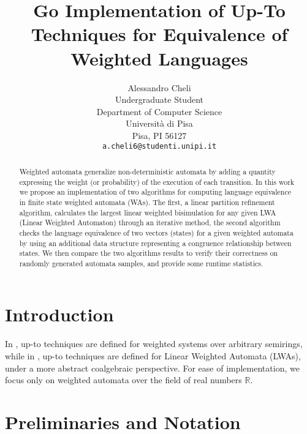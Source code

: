 \documentclass{article}
\title{Go Implementation of Up-To Techniques for Equivalence of Weighted Languages}
\author{
  Alessandro Cheli \\
  Undergraduate Student \\
  Department of Computer Science \\
  Università di Pisa\\
  Pisa, PI 56127 \\
  \texttt{a.cheli6@studenti.unipi.it} \\
}
\theoremstyle{plain}%
\theoremstyle{definition}
\theoremstyle{remark}
\def\R{\mathbb{R}}
\begin{document}
\maketitle

\begin{abstract}
Weighted automata generalize non-deterministic automata by adding
a quantity expressing the weight (or probability) of the execution of each transition.
In this work we propose an implementation of two algorithms for computing language 
equivalence in finite state weighted automata (WAs). The first, a
linear partition refinement algorithm, calculates the largest linear weighted bisimulation
for any given LWA (Linear Weighted Automaton) through an iterative method, 
the second algorithm checks the language equivalence 
of two vectors (states) for a given weighted automata by using an additional
data structure representing a congruence relationship between states.
We then compare the two algorithms results to verify their correctness
on randomly generated automata samples, and provide some runtime statistics.

\end{abstract}




\section{Introduction}
\label{sec:intro}

In \cite{DBLP:journals/corr/Bonchi0K17}, up-to techniques are defined for
weighted systems over arbitrary semirings, while in \cite{BONCHI201277}, up-to techniques
are defined for Linear Weighted Automata (LWAs), under a more abstract coalgebraic perspective.
For ease of implementation, we focus only on weighted automata over the field of real numbers 
$\R$. 

\section{Preliminaries and Notation}
\label{sec:notation}
\end{document}
